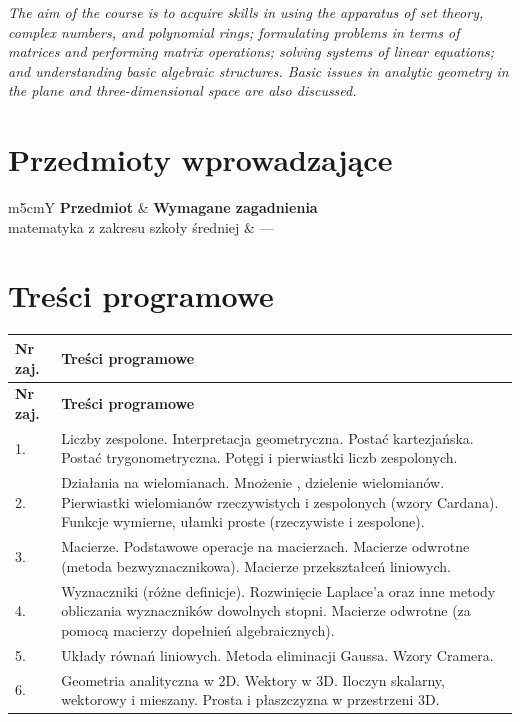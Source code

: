 \documentclass[12pt, a4paper]{article}
\newcommand{\thdrule}{\noalign{\global\setlength{\extrarowheight}{0pt}}}
\newcommand{\thdend}{\noalign{\global\setlength{\extrarowheight}{3pt}}}
\begin{document}
\textit{The aim of the course is to acquire skills in using the apparatus of set theory, complex numbers, and polynomial rings; formulating problems in terms of matrices and performing matrix operations; solving systems of linear equations; and understanding basic algebraic structures. Basic issues in analytic geometry in the plane and three-dimensional space are also discussed.}


\section{Przedmioty wprowadzające}

{\scriptsize
\begin{tabularx}{\textwidth}{m{5cm}Y}
\thdrule\toprule
{} {\color{white}\textbf{Przedmiot}} & {\color{white}\textbf{Wymagane zagadnienia}} \\
\midrule\thdend
   matematyka z zakresu szkoły średniej & --- \\
\bottomrule
\end{tabularx}}

\section{Treści programowe}

{\scriptsize
\begin{longtable}{m{1.5cm}m{14.5cm}}
\thdrule\toprule
\rowcolor{pjatkRed} {\color{white}\textbf{Nr zaj.}} & {\color{white}\textbf{Treści programowe}} \\
\midrule\thdend
\endfirsthead
\thdrule\toprule
\rowcolor{pjatkRed} {\color{white}\textbf{Nr zaj.}} & {\color{white}\textbf{Treści programowe}} \\
\midrule\thdend
\endhead
  \rowcolor{tableRowLight} 1. & Liczby zespolone. Interpretacja geometryczna. Postać kartezjańska.  Postać trygonometryczna. Potęgi i pierwiastki liczb zespolonych. \\
  \rowcolor{tableRowAlt} 2. & Działania na wielomianach. Mnożenie , dzielenie wielomianów.  Pierwiastki wielomianów rzeczywistych i zespolonych (wzory Cardana). Funkcje wymierne, ułamki proste (rzeczywiste i zespolone). \\
  \rowcolor{tableRowLight} 3. & Macierze. Podstawowe operacje na macierzach.  Macierze odwrotne (metoda bezwyznacznikowa). Macierze przekształceń liniowych. \\
  \rowcolor{tableRowAlt} 4. & Wyznaczniki (różne definicje).  Rozwinięcie Laplace’a oraz inne metody obliczania wyznaczników dowolnych stopni.  Macierze odwrotne (za pomocą macierzy dopełnień algebraicznych). \\
  \rowcolor{tableRowLight} 5. & Układy równań liniowych. Metoda eliminacji Gaussa. Wzory Cramera. \\
  \rowcolor{tableRowAlt} 6. & Geometria analityczna w 2D.  Wektory w 3D. Iloczyn skalarny, wektorowy i mieszany.  Prosta i płaszczyzna w przestrzeni 3D. \\
\bottomrule
\end{longtable}}
\end{document}
